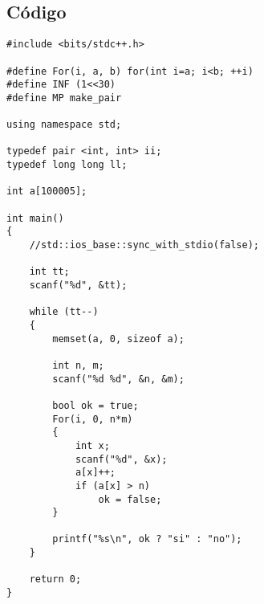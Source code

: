 \subsection*{Código}
\begin{verbatim}
#include <bits/stdc++.h>
 
#define For(i, a, b) for(int i=a; i<b; ++i)
#define INF (1<<30)
#define MP make_pair
 
using namespace std;
 
typedef pair <int, int> ii;
typedef long long ll;
 
int a[100005];
 
int main()
{
    //std::ios_base::sync_with_stdio(false);
 
    int tt;
    scanf("%d", &tt);
 
    while (tt--)
    {
        memset(a, 0, sizeof a);
 
        int n, m;
        scanf("%d %d", &n, &m);
 
        bool ok = true;
        For(i, 0, n*m)
        {
            int x;
            scanf("%d", &x);
            a[x]++;
            if (a[x] > n)
                ok = false;
        }
 
        printf("%s\n", ok ? "si" : "no");
    }
 
    return 0;
}
\end{verbatim}